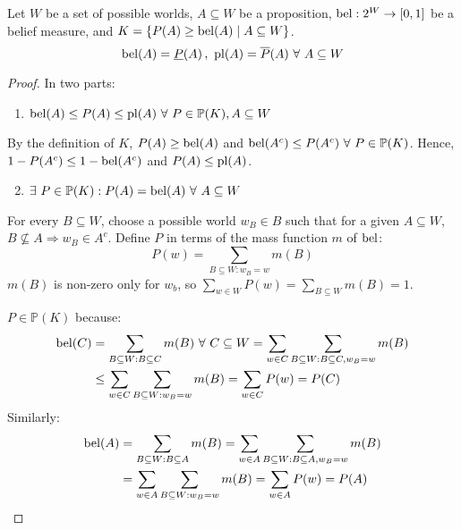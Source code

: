 \begin{thm}
  Let $W$ be a set of possible worlds, $A \subseteq W$ be a proposition,
  $\operatorname*{bel} : 2^W \to [0, 1]$ be a belief measure, and
  $K = \{ P(A) \geq \operatorname*{bel}(A) \mid A \subseteq W \}$.
  \begin{equation}
    \operatorname*{bel}(A) = \underline{P}(A)\,,\
    \operatorname*{pl}(A) = \overline{P}(A)
    \ \forall\ A \subseteq W
  \end{equation}
  \begin{proof}
    In two parts:
    \begin{enumerate}
      \item $\bel(A) \leq P(A) \leq \pl(A) \ \forall\ P \in \mathbb{P}(K), A \subseteq W$
    \end{enumerate}

    By the definition of $K$, $P(A) \geq \operatorname*{bel}(A)$ and $\operatorname*{bel}(A^c) \leq P(A^c) \
      \forall\ P \in \mathbb{P}(K)$.
    Hence, $1 - P(A^c) \leq 1 - \operatorname*{bel}(A^c)$ and $P(A) \leq \operatorname*{pl}(A)$.

    \begin{enumerate}
      \setcounter{enumi}{1}
      \item $\exists\ P \in \mathbb{P}(K) : P(A) = \operatorname*{bel}(A) \ \forall\ A \subseteq W$
    \end{enumerate}

    For every $B \subseteq W$, choose a possible world $w_B \in B$ such that for a
    given $A \subseteq W$, $B \not\subseteq A \Rightarrow w_B \in A^c$.
    Define $P$ in terms of the mass function $m$ of $\operatorname*{bel}$:
    \begin{equation*}
      P(w) = \sum_{B \subseteq W : w_B = w} m(B)
    \end{equation*}
    $m(B)$ is non-zero
    only for $w_b$, so $\sum_{w \in W} P(w) = \sum_{B \subseteq W} m(B) = 1$.

    $P \in \mathbb{P}(K)$ because:
    \begin{align*}
      \operatorname*{bel}(C)
       & = \sum_{B \subseteq W : B \subseteq C} m(B) \ \forall\ C \subseteq W
      = \sum_{w \in C} \sum_{B \subseteq W : B \subseteq C, w_B = w} m(B)
      \\
       & \leq \sum_{w \in C} \sum_{B \subseteq W : w_B = w} m(B)
      = \sum_{w \in C} P(w)
      = P(C)
    \end{align*}
    Similarly:
    \begin{align*}
      \operatorname*{bel}(A)
       & = \sum_{B \subseteq W : B \subseteq A} m(B)
      = \sum_{w \in A} \sum_{B \subseteq W : B \subseteq A, w_B = w} m(B)
      \\
       & = \sum_{w \in A} \sum_{B \subseteq W : w_B = w} m(B)
      = \sum_{w \in A}
      P(w) = P(A)
    \end{align*}
  \end{proof}
\end{thm}

